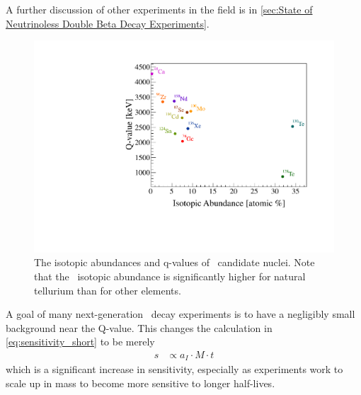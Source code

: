 A further discussion of other experiments in the field is in \autoref{sec:State of Neutrinoless Double Beta Decay Experiments}.
\begin{figure}[htbp]
    \centering
    \includegraphics[width=0.7\linewidth]{Figures/q_vs_ia-color.pdf}
    \caption[The isotopic abundances and q-values of \zeronubb~candidate nuclei.]
    {The isotopic abundances and q-values of \zeronubb~candidate nuclei.
    Note that the \teonethirty~isotopic abundance is significantly higher for natural tellurium than for other elements.}
    \label{fig:q_vs_ia-color}
\end{figure}
A goal of many next-generation \zeronubb~decay experiments is to have a negligibly small background near the Q-value.
This changes the calculation in \autoref{eq:sensitivity_short} to be merely
\begin{align}
    s &\propto a_I \cdot M \cdot t
\end{align}
which is a significant increase in sensitivity, especially as experiments work to scale up in mass to become more sensitive to longer half-lives.
